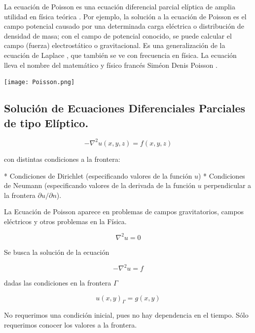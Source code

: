 \documentclass[12pt]{article}
\begin{document}
La ecuación de Poisson es una ecuación diferencial parcial elíptica de amplia utilidad en física teórica . Por ejemplo, la solución a la ecuación de Poisson es el campo potencial causado por una determinada carga eléctrica o distribución de densidad de masa; con el campo de potencial conocido, se puede calcular el campo (fuerza) electrostático o gravitacional. Es una generalización de la ecuación de Laplace , que también se ve con frecuencia en física. La ecuación lleva el nombre del matemático y físico francés Siméon Denis Poisson .

\begin{center}
\texttt{[image: Poisson.png]}
\end{center}






\subsection{Solución de Ecuaciones Diferenciales Parciales de tipo Elíptico.}

\begin{equation*}
- \nabla^2 u(x,y,z) = f(x,y,z) 
\end{equation*}

con distintas condiciones a la frontera:


*   Condiciones de Dirichlet (especificando valores de la función $u$)
*   Condiciones de Neumann (especificando valores de la derivada de la función $u$ perpendicular a la frontera $\partial u/\partial n$).

La Ecuación de Poisson aparece en problemas de campos gravitatorios, campos eléctricos y otros problemas en la Física. 



\begin{equation*}
\nabla^2 u = 0
\end{equation*}

Se busca la solución de la ecuación 

\begin{equation*}
- \nabla^2 u = f
\end{equation*}

dadas las condiciones en la frontera $\Gamma$

\begin{equation*}
u(x,y)_{\Gamma} = g(x,y)
\end{equation*}

No requerimos una condición inicial, pues no hay dependencia en el tiempo. Sólo requerimos conocer los valores a la frontera.
\end{document}
